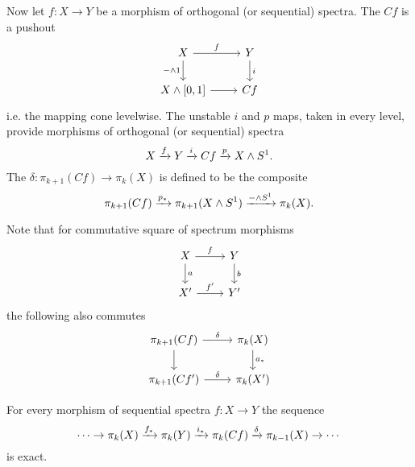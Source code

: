 \begin{construction}
Now let $f:X\to Y$ be a morphism of orthogonal (or sequential) spectra. The  $Cf$ is a pushout
\[
\begin{tikzcd}
X \ar[d,"-\smsh1"'] \ar[r,"f"] & Y \ar[d,"i"]\\
X\smsh[0,1] \ar[r] & Cf
\end{tikzcd}
\]
i.e. the mapping cone levelwise. The unstable $i$ and $p$ maps, taken in every level, provide morphisms of orthogonal (or sequential) spectra
\[X\xrightarrow{f}Y\xrightarrow{i}Cf\xrightarrow{p}X\wedge S^1.\]
The  $\delta:\pi_{k+1}(Cf)\to\pi_k(X)$ is defined to be the composite
\[\pi_{k+1}(Cf)\xrightarrow{p_*}\pi_{k+1}(X\wedge S^1)\xrightarrow{-\wedge S^1}\pi_k(X).\]
\end{construction}

\begin{remark}
Note that for commutative square of spectrum morphisms
{\small\[
\begin{tikzcd}
X \ar[d,"a"] \ar[r,"f"] & Y \ar[d,"b"]\\
X' \ar[r,"f'"] & Y'
\end{tikzcd}
\]}
the following also commutes
{\small\[
\begin{tikzcd}
\pi_{k+1}(Cf) \ar[d] \ar[r,"\delta"] & \pi_k(X) \ar[d,"a_*"]\\
\pi_{k+1}(Cf') \ar[r,"\delta"] & \pi_k(X')
\end{tikzcd}
\]}
\end{remark}

\smallskip
\begin{proposition}
For every morphism of sequential spectra $f:X\to Y$ the sequence
\[\cdots\to\pi_k(X)\xrightarrow{f_*}\pi_k(Y)\xrightarrow{i_*}\pi_k(Cf)\xrightarrow{\delta}\pi_{k-1}(X)\to\cdots\]
is exact.
\end{proposition}

